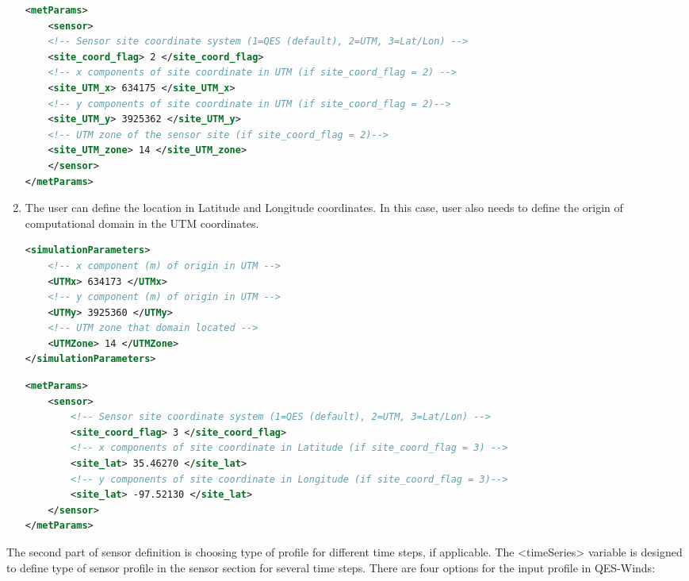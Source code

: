 \begin{enumerate}
\begin{lstlisting}[language=XML]
<metParams>
	<sensor>
	<!-- Sensor site coordinate system (1=QES (default), 2=UTM, 3=Lat/Lon) -->
	<site_coord_flag> 2 </site_coord_flag> 		
	<!-- x components of site coordinate in UTM (if site_coord_flag = 2) -->	
	<site_UTM_x> 634175 </site_UTM_x> 
	<!-- y components of site coordinate in UTM (if site_coord_flag = 2)-->		
	<site_UTM_y> 3925362 </site_UTM_y>
	<!-- UTM zone of the sensor site (if site_coord_flag = 2)--> 				
	<site_UTM_zone> 14 </site_UTM_zone> 				
	</sensor>
</metParams>
\end{lstlisting}
\noindent
\item The user can define the location in Latitude and Longitude coordinates. In this case, user also needs to define the origin of computational domain in the UTM coordinates.

\begin{lstlisting}[language=XML]
<simulationParameters>
	<!-- x component (m) of origin in UTM -->
	<UTMx> 634173 </UTMx>
	<!-- y component (m) of origin in UTM --> 						
	<UTMy> 3925360 </UTMy> 	
	<!-- UTM zone that domain located -->					
	<UTMZone> 14 </UTMZone> 						
</simulationParameters>
\end{lstlisting}

\begin{lstlisting}[language=XML]
<metParams>
	<sensor>
		<!-- Sensor site coordinate system (1=QES (default), 2=UTM, 3=Lat/Lon) -->
		<site_coord_flag> 3 </site_coord_flag> 		
		<!-- x components of site coordinate in Latitude (if site_coord_flag = 3) -->	
		<site_lat> 35.46270 </site_lat> 		
		<!-- y components of site coordinate in Longitude (if site_coord_flag = 3)-->		
		<site_lat> -97.52130 </site_lat> 				
	</sensor>
</metParams>
\end{lstlisting}

\end{enumerate}

The second part of sensor definition is choosing type of profile for different time steps, if applicable. The <timeSeries> variable is designed to define type of sensor profile in the sensor section for several time steps. There are four options for the input profile in QES-Winds:

